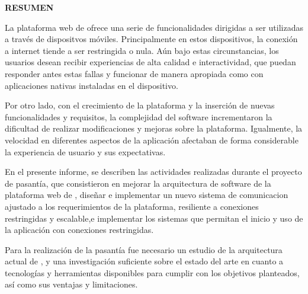 \setcounter{page}{4}
\begin{center}
\textsc{\bfseries\uppercase{Resumen}}
\end{center}

La plataforma web de \business ofrece una serie de funcionalidades dirigidas a ser utilizadas a través de dispositvos móviles. Principalmente en estos dispositivos, la conexión a internet tiende a ser restringida o nula. Aún bajo estas circunstancias, los usuarios desean recibir experiencias de alta calidad e interactividad, que puedan responder antes estas fallas y funcionar de manera apropiada como con aplicaciones nativas instaladas en el dispositivo.

Por otro lado, con el crecimiento de la plataforma y la inserción de nuevas funcionalidades y requisitos, la complejidad del software incrementaron la dificultad de realizar modificaciones y mejoras sobre la plataforma. Igualmente, la velocidad en diferentes aspectos de la aplicación afectaban de forma considerable la experiencia de usuario y sus expectativas.

En el presente informe, se describen las actividades realizadas durante el proyecto de pasantía, que consistieron en mejorar la arquitectura de software de la plataforma web de \business, diseñar e implementar un nuevo sistema de comunicacion ajustado a los requerimientos de la plataforma, resiliente a conexiones restringidas y escalable,e implementar los sistemas que permitan el inicio y uso de la aplicación con conexiones restringidas.

Para la realización de la pasantía fue necesario un estudio de la arquitectura actual de \business, y una investigación suficiente sobre el estado del arte en cuanto a tecnologías y herramientas disponibles para cumplir con los objetivos planteados, así como sus ventajas y limitaciones.

\newpage

